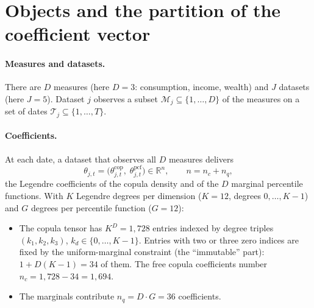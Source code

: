 \documentclass[11pt]{article}
\newcommand{\cop}{\mathrm{cop}}
\newcommand{\pcf}{\mathrm{pcf}}
\newcommand{\R}{\mathbb{R}}
\begin{document}
\section{Objects and the partition of the coefficient vector}\label{sec:objects}

\paragraph{Measures and datasets.} There are $D$ measures (here $D = 3$:
consumption, income, wealth) and $J$ datasets (here $J = 5$). Dataset $j$
observes a subset $\mathcal{M}_j \subseteq \{1,\ldots,D\}$ of the measures on a
set of dates $\mathcal{T}_j \subseteq \{1,\ldots,T\}$.

\paragraph{Coefficients.} At each date, a dataset that observes all $D$
measures delivers
\begin{equation}
  \theta_{j,t} = \bigl(\theta^{\cop}_{j,t},\;\theta^{\pcf}_{j,t}\bigr) \in \R^{n},
  \qquad n = n_c + n_q ,
\end{equation}
the Legendre coefficients of the copula density and of the $D$ marginal
percentile functions. With $K$ Legendre degrees per dimension ($K = 12$,
degrees $0,\ldots,K-1$) and $G$ degrees per percentile function ($G = 12$):
\begin{itemize}[leftmargin=*]
  \item The copula tensor has $K^D = 1{,}728$ entries indexed by degree triples
        $(k_1,k_2,k_3)$, $k_d \in \{0,\ldots,K-1\}$. Entries with two or three
        zero indices are fixed by the uniform-marginal constraint (the
        ``immutable'' part): $1 + D(K-1) = 34$ of them. The free copula
        coefficients number $n_c = 1{,}728 - 34 = 1{,}694$.
  \item The marginals contribute $n_q = D\cdot G = 36$ coefficients.
\end{itemize}
\end{document}
